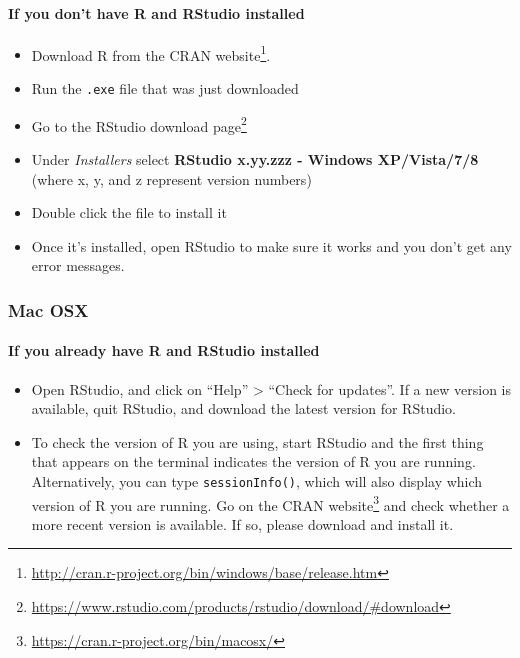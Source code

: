\documentclass[
  12pt,
]{book}
\newcommand{\passthrough}[1]{#1}
\providecommand{\tightlist}{%
  \setlength{\itemsep}{0pt}\setlength{\parskip}{0pt}}
\renewcommand{\href}[2]{#2\footnote{\url{#1}}}
\theoremstyle{definition}
\theoremstyle{definition}
\theoremstyle{definition}
\newcommand{\1}{\mathbbm{1}}
\begin{document}
\hypertarget{if-you-dont-have-r-and-rstudio-installed}{%
\paragraph{If you don't have R and RStudio installed}\label{if-you-dont-have-r-and-rstudio-installed}}

\begin{itemize}
\tightlist
\item
  Download R from
  the \href{http://cran.r-project.org/bin/windows/base/release.htm}{CRAN website}.
\item
  Run the \passthrough{\lstinline!.exe!} file that was just downloaded
\item
  Go to the \href{https://www.rstudio.com/products/rstudio/download/\#download}{RStudio download
  page}
\item
  Under \emph{Installers} select \textbf{RStudio x.yy.zzz - Windows
  XP/Vista/7/8} (where x, y, and z represent version numbers)
\item
  Double click the file to install it
\item
  Once it's installed, open RStudio to make sure it works and you don't get any
  error messages.
\end{itemize}

\hypertarget{mac-osx}{%
\subsubsection{Mac OSX}\label{mac-osx}}

\hypertarget{if-you-already-have-r-and-rstudio-installed-1}{%
\paragraph{If you already have R and RStudio installed}\label{if-you-already-have-r-and-rstudio-installed-1}}

\begin{itemize}
\tightlist
\item
  Open RStudio, and click on ``Help'' \textgreater{} ``Check for updates''. If a new version is
  available, quit RStudio, and download the latest version for RStudio.
\item
  To check the version of R you are using, start RStudio and the first thing
  that appears on the terminal indicates the version of R you are running.
  Alternatively, you can type \passthrough{\lstinline!sessionInfo()!}, which will also display which
  version of R you are running. Go on the \href{https://cran.r-project.org/bin/macosx/}{CRAN
  website} and check whether a more
  recent version is available. If so, please download and install it.
\end{itemize}
\end{document}
